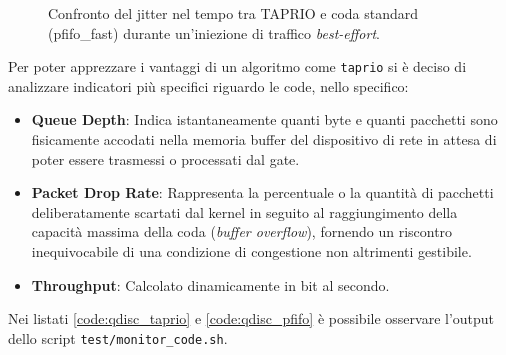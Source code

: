 \documentclass[12pt,a4paper,twoside]{book}
\begin{document}
\begin{onehalfspace}
\begin{figure}[H]
    \caption{Confronto del jitter nel tempo tra TAPRIO e coda standard (pfifo\_fast) durante un'iniezione di traffico \textit{best-effort}.}
    \label{fig:jitter}
\end{figure}

Per poter apprezzare i vantaggi di un algoritmo come \texttt{taprio} si è deciso di analizzare indicatori più specifici riguardo le code, nello specifico:
\begin{itemize}
\item \textbf{Queue Depth}: Indica istantaneamente quanti byte e quanti pacchetti sono fisicamente accodati nella memoria buffer del dispositivo di rete in attesa di poter essere trasmessi o processati dal gate.
\item \textbf{Packet Drop Rate}: Rappresenta la percentuale o la quantità di pacchetti deliberatamente scartati dal kernel in seguito al raggiungimento della capacità massima della coda (\textit{buffer overflow}), fornendo un riscontro inequivocabile di una condizione di congestione non altrimenti gestibile.
\item \textbf{Throughput}: Calcolato dinamicamente in bit al secondo.
\end{itemize}

Nei listati \ref{code:qdisc_taprio} e \ref{code:qdisc_pfifo} è possibile osservare l'output dello script \texttt{test/monitor\_code.sh}.


\end{onehalfspace}
\end{document}
